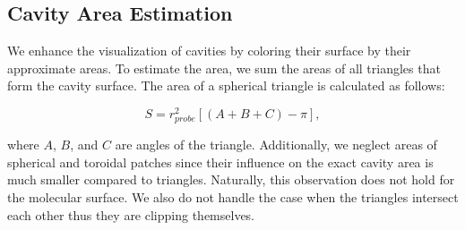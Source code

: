 \subsection{Cavity Area Estimation}\label{sec:area}
We enhance the visualization of cavities by coloring their surface by their approximate areas.
To estimate the area, we sum the areas of all triangles that form the cavity surface.
The area of a spherical triangle is calculated as follows:

\begin{equation}
  S = r_{probe}^2 \left[ \left( A + B + C \right) - \pi \right],
\end{equation}

where $A$, $B$, and $C$ are angles of the triangle. 
Additionally, we neglect areas of spherical and toroidal patches since their influence on the exact cavity area is much smaller compared to triangles.
Naturally, this observation does not hold for the molecular surface.
We also do not handle the case when the triangles intersect each other thus they are clipping themselves.
